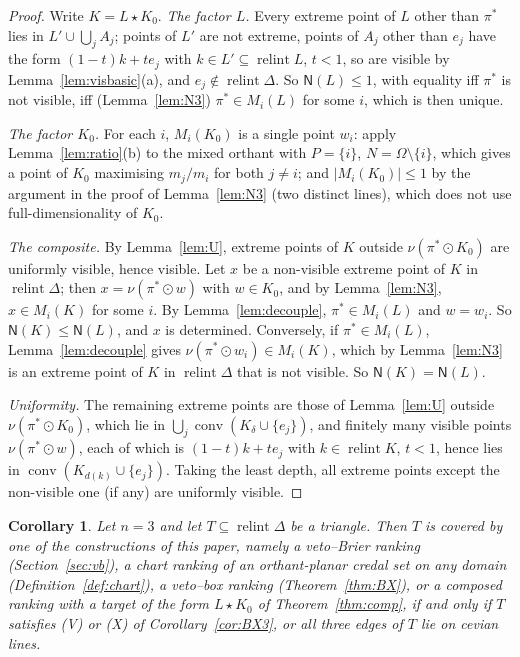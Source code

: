 \documentclass[11pt]{article}
\DeclareMathOperator{\conv}{conv}
\DeclareMathOperator{\relint}{relint}
\theoremstyle{plain}
\newtheorem{corollary}[theorem]{Corollary}
\theoremstyle{definition}
\theoremstyle{remark}
\begin{document}
\begin{proof}
Write $K=L\star K_0$. \emph{The factor $L$.} Every extreme point of $L$ other than
$\pi^\ast$ lies in $L'\cup\bigcup_jA_j$; points of $L'$ are not extreme, points of $A_j$
other than $e_j$ have the form $(1-t)k+te_j$ with $k\in L'\subseteq\relint L$, $t<1$, so are
visible by Lemma~\ref{lem:visbasic}(a), and $e_j\notin\relint\Delta$. So $\mathsf N(L)\le
1$, with equality iff $\pi^\ast$ is not visible, iff (Lemma~\ref{lem:N3}) $\pi^\ast\in
M_i(L)$ for some $i$, which is then unique.

\emph{The factor $K_0$.} For each $i$, $M_i(K_0)$ is a single point $w_i$: apply
Lemma~\ref{lem:ratio}(b) to the mixed orthant with $P=\{i\}$, $N=\Omega\setminus\{i\}$,
which gives a point of $K_0$ maximising $m_j/m_i$ for both $j\ne i$; and $|M_i(K_0)|\le1$
by the argument in the proof of Lemma~\ref{lem:N3} (two distinct lines), which does not use
full-dimensionality of $K_0$.

\emph{The composite.} By Lemma~\ref{lem:U}, extreme points of $K$ outside
$\nu(\pi^\ast\odot K_0)$ are uniformly visible, hence visible. Let $x$ be a non-visible
extreme point of $K$ in $\relint\Delta$; then $x=\nu(\pi^\ast\odot w)$ with $w\in K_0$, and
by Lemma~\ref{lem:N3}, $x\in M_i(K)$ for some $i$. By Lemma~\ref{lem:decouple},
$\pi^\ast\in M_i(L)$ and $w=w_i$. So $\mathsf N(K)\le\mathsf N(L)$, and $x$ is determined.
Conversely, if $\pi^\ast\in M_i(L)$, Lemma~\ref{lem:decouple} gives $\nu(\pi^\ast\odot w_i)
\in M_i(K)$, which by Lemma~\ref{lem:N3} is an extreme point of $K$ in $\relint\Delta$ that is
not visible. So $\mathsf N(K)=\mathsf N(L)$.

\emph{Uniformity.} The remaining extreme points are those of Lemma~\ref{lem:U} outside
$\nu(\pi^\ast\odot K_0)$, which lie in $\bigcup_j\conv(K_\delta\cup\{e_j\})$, and finitely
many visible points $\nu(\pi^\ast\odot w)$, each of which is $(1-t)k+te_j$ with
$k\in\relint K$, $t<1$, hence lies in $\conv(K_{d(k)}\cup\{e_j\})$. Taking the least depth,
all extreme points except the non-visible one (if any) are uniformly visible.
\end{proof}

\begin{corollary}\label{cor:trireach}
Let $n=3$ and let $T\subseteq\relint\Delta$ be a triangle. Then $T$ is covered by one of
the constructions of this paper, namely a veto--Brier ranking (Section~\ref{sec:vb}), a
chart ranking of an orthant-planar credal set on any domain (Definition~\ref{def:chart}), a
veto--box
ranking (Theorem~\ref{thm:BX}), or a composed ranking with a target of the form
$L\star K_0$ of Theorem~\ref{thm:comp}, if and only if $T$ satisfies (V) or (X) of
Corollary~\ref{cor:BX3}, or all three edges of $T$ lie on cevian lines.
\end{corollary}
\end{document}
